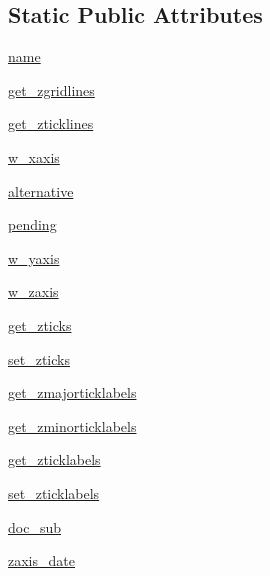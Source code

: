 \subsection*{Static Public Attributes}
\begin{DoxyCompactItemize}
\item 
\hyperlink{classmplot3d_1_1axes3d_1_1Axes3D_a4915ed02b8922be0df85a3679f59314d}{name}
\item 
\hyperlink{classmplot3d_1_1axes3d_1_1Axes3D_abb618010bdc77ff3e67fab30d9ba03ab}{get\+\_\+zgridlines}
\item 
\hyperlink{classmplot3d_1_1axes3d_1_1Axes3D_ac159735f37334422f81cf9572b343dde}{get\+\_\+zticklines}
\item 
\hyperlink{classmplot3d_1_1axes3d_1_1Axes3D_a1dc13e953a7f2a6f6321376e0201a763}{w\+\_\+xaxis}
\item 
\hyperlink{classmplot3d_1_1axes3d_1_1Axes3D_a41da38a7e289d6206fecbc8d0206c378}{alternative}
\item 
\hyperlink{classmplot3d_1_1axes3d_1_1Axes3D_acf86f17c806040356b44b37a9b0f42ee}{pending}
\item 
\hyperlink{classmplot3d_1_1axes3d_1_1Axes3D_a813c50d071d43087c5d60db4a0012898}{w\+\_\+yaxis}
\item 
\hyperlink{classmplot3d_1_1axes3d_1_1Axes3D_a8045878366d4b7ddd3a25ff527121b81}{w\+\_\+zaxis}
\item 
\hyperlink{classmplot3d_1_1axes3d_1_1Axes3D_ae216e46c4b36eab8d2b2d542874cb4f0}{get\+\_\+zticks}
\item 
\hyperlink{classmplot3d_1_1axes3d_1_1Axes3D_ada39d24ad67b3728df5a49862f457afc}{set\+\_\+zticks}
\item 
\hyperlink{classmplot3d_1_1axes3d_1_1Axes3D_a67fb457d07b2efe808f9b4f744f2ca65}{get\+\_\+zmajorticklabels}
\item 
\hyperlink{classmplot3d_1_1axes3d_1_1Axes3D_a8a1f0d081b44a009d901642c59783b61}{get\+\_\+zminorticklabels}
\item 
\hyperlink{classmplot3d_1_1axes3d_1_1Axes3D_a9e6ac590b93df84f45a4ac127c0be638}{get\+\_\+zticklabels}
\item 
\hyperlink{classmplot3d_1_1axes3d_1_1Axes3D_a37fa89a95b82fadc13c67277d8c438ca}{set\+\_\+zticklabels}
\item 
\hyperlink{classmplot3d_1_1axes3d_1_1Axes3D_aeda925c1919423d1736a93df7a55186b}{doc\+\_\+sub}
\item 
\hyperlink{classmplot3d_1_1axes3d_1_1Axes3D_a3da3d7de53877ba53b4e202123b854f0}{zaxis\+\_\+date}
\item 

\end{DoxyCompactItemize}
